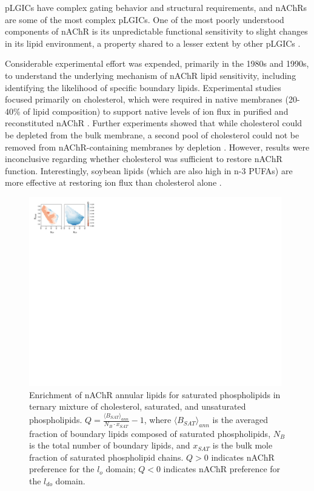 \documentclass{article}
\begin{document}
pLGICs have complex gating behavior and structural requirements, and nAChRs are some of the most complex pLGICs. One of the most poorly understood components of nAChR is its unpredictable functional sensitivity to slight changes in its lipid environment, a property shared to a lesser extent by other pLGICs \cite{M.CriadoH.Eibl1982,Conti2013}.

Considerable experimental effort \cite{Fong_Correlation_1986,Sunshine_Lipid_1992,Hamouda_Assessing_2006,Butler_FTIR_1993,Bhushan_Correlation_1993,Fong_Stabilization_1987,Corrie_Lipid_2002} was expended, primarily in the 1980s and 1990s, to understand the underlying mechanism of nAChR lipid sensitivity, including identifying the likelihood of specific boundary lipids. Experimental studies focused primarily on cholesterol, which were required in native membranes (20-40\% of lipid composition) to support native levels of ion flux in purified and reconstituted nAChR \cite{Fong_Correlation_1986,Fong_Stabilization_1987}. Further experiments showed that while cholesterol could be depleted from the bulk membrane, a second pool of cholesterol could not be removed from nAChR-containing membranes by depletion \cite{Leibel1987}. However, results were inconclusive regarding whether cholesterol was sufficient to restore nAChR function. Interestingly, soybean lipids (which are also high in n-3 PUFAs) \cite{Yoshida1986,Regost2003,Olsen2003} are more effective at restoring ion flux than cholesterol alone \cite{Morales2006}.

\begin{figure}[t!]\center
	\includegraphics[width=11cm]{./F31/Q.pdf}
	\caption{Enrichment of nAChR annular lipids for saturated phospholipids in ternary mixture of cholesterol, saturated, and unsaturated phospholipids. $Q=\frac{\langle B_{SAT}\rangle_{ann}}{N_B\cdot x_{SAT}}-1$, where $\langle B_{SAT}\rangle_{ann}$ is the averaged fraction of boundary lipids composed of saturated phospholipids, $N_B$ is the total number of boundary lipids, and $x_{SAT}$ is the bulk mole fraction of saturated phospholipid chains. $Q>0$ indicates nAChR preference for the $l_o$ domain; $Q<0$ indicates nAChR preference for the $l_{do}$ domain.}
	\label{fig:Q}
\end{figure}
\end{document}
